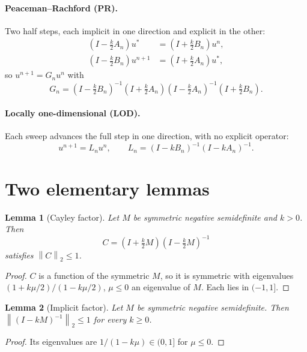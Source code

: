 \documentclass[11pt]{article}
\newtheorem{lemma}{Lemma}
\theoremstyle{remark}
\newcommand{\norm}[1]{\left\lVert #1 \right\rVert}
\newcommand{\Id}{I}
\begin{document}
\paragraph{Peaceman--Rachford (PR).} Two half steps, each implicit in one direction and explicit in the other:
\begin{align}
  \left(\Id - \tfrac{k}{2}A_n\right) u^{*} &= \left(\Id + \tfrac{k}{2}B_n\right) u^{n}, \\
  \left(\Id - \tfrac{k}{2}B_n\right) u^{n+1} &= \left(\Id + \tfrac{k}{2}A_n\right) u^{*},
\end{align}
so $u^{n+1} = G_n u^n$ with
\begin{equation}
  G_n = \left(\Id - \tfrac{k}{2}B_n\right)^{-1}\left(\Id + \tfrac{k}{2}A_n\right)\left(\Id - \tfrac{k}{2}A_n\right)^{-1}\left(\Id + \tfrac{k}{2}B_n\right).
  \label{eq:G}
\end{equation}

\paragraph{Locally one-dimensional (LOD).} Each sweep advances the full step in one direction, with no explicit operator:
\begin{equation}
  u^{n+1} = L_n u^n, \qquad L_n = \left(\Id - kB_n\right)^{-1}\left(\Id - kA_n\right)^{-1}.
  \label{eq:L}
\end{equation}

\section{Two elementary lemmas}

\begin{lemma}[Cayley factor]\label{lem:cayley}
Let $M$ be symmetric negative semidefinite and $k > 0$. Then
\begin{equation}
  C = \left(\Id + \tfrac{k}{2}M\right)\left(\Id - \tfrac{k}{2}M\right)^{-1}
\end{equation}
satisfies $\norm{C}_2 \le 1$.
\end{lemma}
\begin{proof}
$C$ is a function of the symmetric $M$, so it is symmetric with eigenvalues $(1 + k\mu/2)/(1 - k\mu/2)$, $\mu \le 0$ an eigenvalue of $M$. Each lies in $(-1, 1]$.
\end{proof}

\begin{lemma}[Implicit factor]\label{lem:implicit}
Let $M$ be symmetric negative semidefinite. Then $\norm{(\Id - kM)^{-1}}_2 \le 1$ for every $k \ge 0$.
\end{lemma}
\begin{proof}
Its eigenvalues are $1/(1 - k\mu) \in (0, 1]$ for $\mu \le 0$.
\end{proof}
\end{document}
